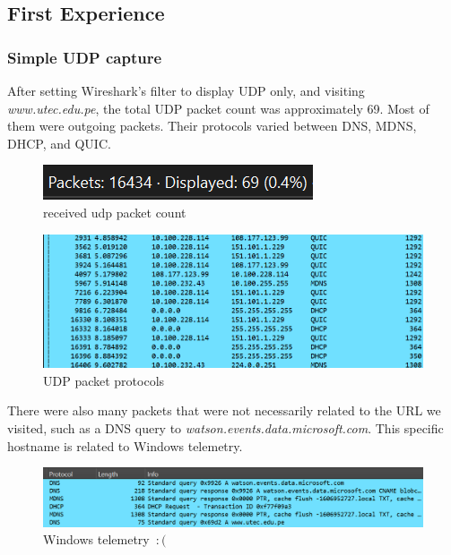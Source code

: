 \subsection{First Experience}

\subsubsection{Simple UDP capture}

After setting Wireshark's filter to display UDP only, and visiting
\textit{www.utec.edu.pe}, the total UDP packet count was approximately 69. Most
of them were outgoing packets. Their protocols varied between DNS, MDNS, DHCP,
and QUIC.\@

\begin{figure}[htbp]
	\centering
	\includegraphics[width=1\linewidth]{img/1.png}
	\caption{received udp packet count}\label{fig:1}
\end{figure}

\begin{figure}[htbp]
	\centering
	\includegraphics[width=1\linewidth]{img/2.png}
	\caption{UDP packet protocols}\label{fig:2}
\end{figure}

There were also many packets that were not necessarily related to the URL we
visited, such as a DNS query to \textit{watson.events.data.microsoft.com}. This
specific hostname is related to Windows telemetry.

\begin{figure}[htbp]
	\centering
	\includegraphics[width=1\linewidth]{img/3.png}
	\caption{Windows telemetry~\ensuremath{:(}}\label{fig:3}
\end{figure}

